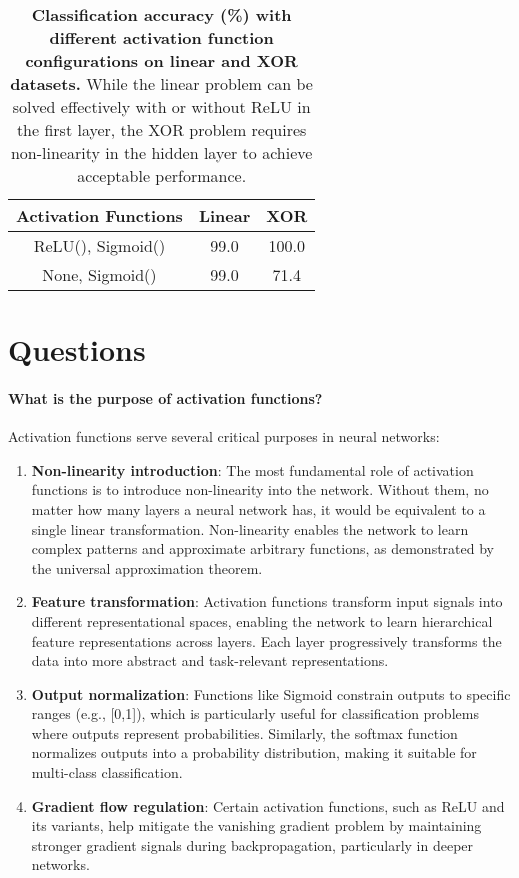 \documentclass[twocolumn]{extarticle}
\begin{document}
\begin{table}[t]
\centering
\caption{\textbf{Classification accuracy (\%) with different activation function configurations on linear and XOR datasets.} While the linear problem can be solved effectively with or without ReLU in the first layer, the XOR problem requires non-linearity in the hidden layer to achieve acceptable performance.}
\label{tab:act}
\begin{tabular}{@{}ccc@{}}
\toprule
\textbf{Activation Functions} & \textbf{Linear} & \textbf{XOR} \\ \midrule
ReLU(), Sigmoid()          & 99.0            & 100.0        \\
None, Sigmoid()           & 99.0           & 71.4        \\ \bottomrule	
\end{tabular}
\end{table}

\section{Questions}
\paragraph{What is the purpose of activation functions?}
Activation functions serve several critical purposes in neural networks:

\begin{enumerate}
    \item \textbf{Non-linearity introduction}: The most fundamental role of activation functions is to introduce non-linearity into the network. Without them, no matter how many layers a neural network has, it would be equivalent to a single linear transformation. Non-linearity enables the network to learn complex patterns and approximate arbitrary functions, as demonstrated by the universal approximation theorem.

    \item \textbf{Feature transformation}: Activation functions transform input signals into different representational spaces, enabling the network to learn hierarchical feature representations across layers. Each layer progressively transforms the data into more abstract and task-relevant representations.

    \item \textbf{Output normalization}: Functions like Sigmoid constrain outputs to specific ranges (e.g., [0,1]), which is particularly useful for classification problems where outputs represent probabilities. Similarly, the softmax function normalizes outputs into a probability distribution, making it suitable for multi-class classification.

    \item \textbf{Gradient flow regulation}: Certain activation functions, such as ReLU and its variants, help mitigate the vanishing gradient problem by maintaining stronger gradient signals during backpropagation, particularly in deeper networks.
\end{enumerate}
\end{document}
